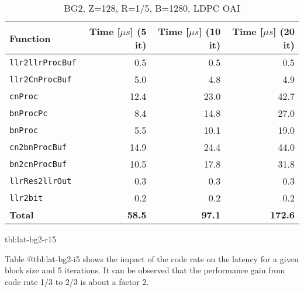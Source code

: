 \documentclass{article}
\begin{document}
\begin{table}[ht]
  \centering
  \begin{tabular}{lrrr}
    \toprule
    \textbf{Function} & \textbf{Time [$\mu s$] (5 it)} & \textbf{Time [$\mu s$] (10 it)} & \textbf{Time [$\mu s$] (20 it)}\\
    \midrule
    \texttt{llr2llrProcBuf} & 0.5  & 0.5  & 0.5  \\
    \texttt{llr2CnProcBuf}  & 5.0  & 4.8  & 4.9  \\
    \texttt{cnProc}         & 12.4 & 23.0 & 42.7 \\
    \texttt{bnProcPc}       & 8.4  & 14.8 & 27.0 \\
    \texttt{bnProc}         & 5.5  & 10.1 & 19.0 \\
    \texttt{cn2bnProcBuf}   & 14.9 & 24.4 & 44.0 \\
    \texttt{bn2cnProcBuf}   & 10.5 & 17.8 & 31.8 \\
    \texttt{llrRes2llrOut}  & 0.3  & 0.3  & 0.3  \\
    \texttt{llr2bit}        & 0.2  & 0.2  & 0.2  \\
    \midrule
    \textbf{Total}          & \textbf{58.5} & \textbf{97.1} & \textbf{172.6} \\
    \bottomrule
  \end{tabular}
  \caption{BG2, Z=128, R=1/5, B=1280, LDPC OAI}
\end{table}{tbl:lat-bg2-r15}

Table {@tbl:lat-bg2-i5} shows the impact of the code rate on the latency for a given block size and 5 iterations. It can be observed that the performance gain from code rate 1/3 to 2/3 is about a factor 2.
\end{document}
